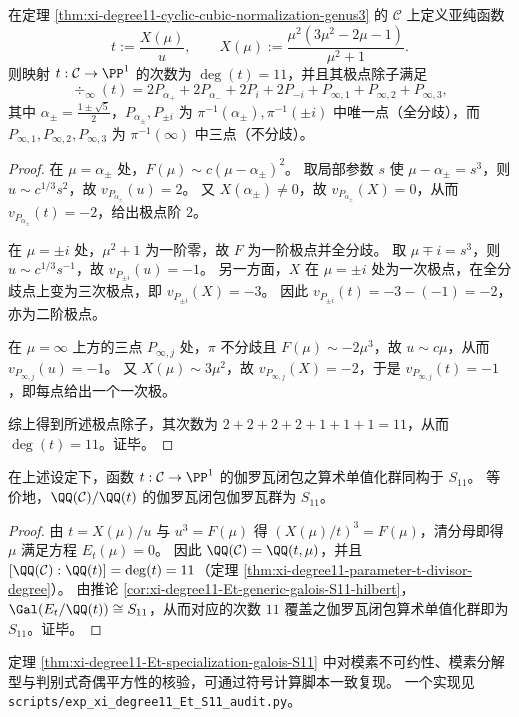 \begin{theorem}[\texorpdfstring{$\mathcal C$}{C} 上自然参数的极点除子与 \texorpdfstring{$\deg(t)=11$}{deg(t)=11}]\label{thm:xi-degree11-parameter-t-divisor-degree}
在定理 \ref{thm:xi-degree11-cyclic-cubic-normalization-genus3} 的 \(\mathcal C\) 上定义亚纯函数
\[
t:=\frac{X(\mu)}{u},
\qquad
X(\mu):=\frac{\mu^2(3\mu^2-2\mu-1)}{\mu^2+1}.
\]
则映射 \(t:\mathcal C\to\PP^1\) 的次数为 \(\deg(t)=11\)，并且其极点除子满足
\[
\div_\infty(t)
=2P_{\alpha_+}+2P_{\alpha_-}+2P_{i}+2P_{-i}+P_{\infty,1}+P_{\infty,2}+P_{\infty,3},
\]
其中 \(\alpha_\pm=\frac{1\pm\sqrt5}{2}\)，\(P_{\alpha_\pm},P_{\pm i}\) 为 \(\pi^{-1}(\alpha_\pm),\pi^{-1}(\pm i)\) 中唯一点（全分歧），而 \(P_{\infty,1},P_{\infty,2},P_{\infty,3}\) 为 \(\pi^{-1}(\infty)\) 中三点（不分歧）。
\end{theorem}
\begin{proof}
在 \(\mu=\alpha_\pm\) 处，\(F(\mu)\sim c(\mu-\alpha_\pm)^2\)。
取局部参数 \(s\) 使 \(\mu-\alpha_\pm=s^3\)，则 \(u\sim c^{1/3}s^2\)，故 \(v_{P_{\alpha_\pm}}(u)=2\)。
又 \(X(\alpha_\pm)\neq 0\)，故 \(v_{P_{\alpha_\pm}}(X)=0\)，从而 \(v_{P_{\alpha_\pm}}(t)=-2\)，给出极点阶 \(2\)。
\par
在 \(\mu=\pm i\) 处，\(\mu^2+1\) 为一阶零，故 \(F\) 为一阶极点并全分歧。
取 \(\mu\mp i=s^3\)，则 \(u\sim c^{1/3}s^{-1}\)，故 \(v_{P_{\pm i}}(u)=-1\)。
另一方面，\(X\) 在 \(\mu=\pm i\) 处为一次极点，在全分歧点上变为三次极点，即 \(v_{P_{\pm i}}(X)=-3\)。
因此 \(v_{P_{\pm i}}(t)=-3-(-1)=-2\)，亦为二阶极点。
\par
在 \(\mu=\infty\) 上方的三点 \(P_{\infty,j}\) 处，\(\pi\) 不分歧且 \(F(\mu)\sim -2\mu^3\)，故 \(u\sim c\mu\)，从而 \(v_{P_{\infty,j}}(u)=-1\)。
又 \(X(\mu)\sim 3\mu^2\)，故 \(v_{P_{\infty,j}}(X)=-2\)，于是 \(v_{P_{\infty,j}}(t)=-1\)，即每点给出一个一次极。
\par
综上得到所述极点除子，其次数为 \(2+2+2+2+1+1+1=11\)，从而 \(\deg(t)=11\)。证毕。
\end{proof}

\begin{corollary}\label{cor:xi-degree11-cover-arithmetic-monodromy-S11}
在上述设定下，函数 \(t:\mathcal C\to\PP^1\) 的伽罗瓦闭包之算术单值化群同构于 \(S_{11}\)。
等价地，\(\QQ(\mathcal C)/\QQ(t)\) 的伽罗瓦闭包伽罗瓦群为 \(S_{11}\)。
\end{corollary}
\begin{proof}
由 \(t=X(\mu)/u\) 与 \(u^3=F(\mu)\) 得 \((X(\mu)/t)^3=F(\mu)\)，清分母即得 \(\mu\) 满足方程 \(E_t(\mu)=0\)。
因此 \(\QQ(\mathcal C)=\QQ(t,\mu)\)，并且 \([\QQ(\mathcal C):\QQ(t)]=\deg(t)=11\)（定理 \ref{thm:xi-degree11-parameter-t-divisor-degree}）。
由推论 \ref{cor:xi-degree11-Et-generic-galois-S11-hilbert}，\(\Gal(E_t/\QQ(t))\cong S_{11}\)，从而对应的次数 \(11\) 覆盖之伽罗瓦闭包算术单值化群即为 \(S_{11}\)。证毕。
\end{proof}

\begin{remark}[可复现的有限域因式分解与判别式审计]\label{rem:xi-degree11-Et-audit-script}
定理 \ref{thm:xi-degree11-Et-specialization-galois-S11} 中对模素不可约性、模素分解型与判别式奇偶平方性的核验，可通过符号计算脚本一致复现。
一个实现见 \texttt{scripts/exp\_xi\_degree11\_Et\_S11\_audit.py}。
\end{remark}

